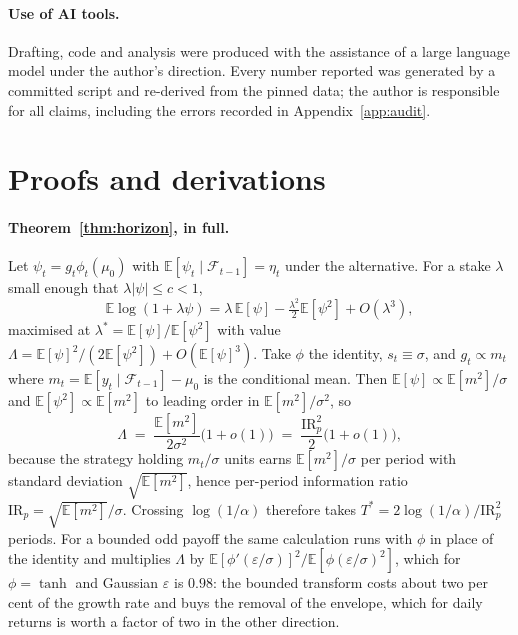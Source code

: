\documentclass{article}
\theoremstyle{plain}
\theoremstyle{definition}
\begin{document}
\paragraph{Use of AI tools.} Drafting, code and analysis were produced with the assistance of
a large language model under the author's direction. Every number reported was generated by a
committed script and re-derived from the pinned data; the author is responsible for all
claims, including the errors recorded in Appendix~\ref{app:audit}.




\appendix

\section{Proofs and derivations}
\label{app:proofs}

\paragraph{Theorem~\ref{thm:horizon}, in full.} Let $\psi_t=g_t\phi_t(\mu_0)$ with
$\mathbb{E}[\psi_t\mid\mathcal{F}_{t-1}]=\eta_t$ under the alternative. For a stake
$\lambda$ small enough that $\lambda|\psi|\le c<1$,
\[
  \mathbb{E}\log(1+\lambda\psi)
  = \lambda\,\mathbb{E}[\psi] - \tfrac{\lambda^2}{2}\mathbb{E}[\psi^2] + O(\lambda^3),
\]
maximised at $\lambda^\ast=\mathbb{E}[\psi]/\mathbb{E}[\psi^2]$ with value
$\Lambda=\mathbb{E}[\psi]^2/(2\mathbb{E}[\psi^2])+O(\mathbb{E}[\psi]^3)$. Take $\phi$ the
identity, $s_t\equiv\sigma$, and $g_t\propto m_t$ where $m_t=\mathbb{E}[y_t\mid
\mathcal{F}_{t-1}]-\mu_0$ is the conditional mean. Then $\mathbb{E}[\psi]\propto
\mathbb{E}[m^2]/\sigma$ and $\mathbb{E}[\psi^2]\propto\mathbb{E}[m^2]$ to leading order in
$\mathbb{E}[m^2]/\sigma^2$, so
\[
  \Lambda \;=\; \frac{\mathbb{E}[m^2]}{2\sigma^2}\big(1+o(1)\big)
           \;=\; \frac{\mathrm{IR}_p^{2}}{2}\big(1+o(1)\big),
\]
because the strategy holding $m_t/\sigma$ units earns $\mathbb{E}[m^2]/\sigma$ per period
with standard deviation $\sqrt{\mathbb{E}[m^2]}$, hence per-period information ratio
$\mathrm{IR}_p=\sqrt{\mathbb{E}[m^2]}/\sigma$. Crossing $\log(1/\alpha)$ therefore takes
$T^\ast=2\log(1/\alpha)/\mathrm{IR}_p^2$ periods. For a bounded odd payoff the same
calculation runs with $\phi$ in place of the identity and multiplies $\Lambda$ by
$\mathbb{E}[\phi'(\varepsilon/\sigma)]^2/\mathbb{E}[\phi(\varepsilon/\sigma)^2]$, which for
$\phi=\tanh$ and Gaussian $\varepsilon$ is $0.98$: the bounded transform costs about two per
cent of the growth rate and buys the removal of the envelope, which for daily returns is
worth a factor of two in the other direction.
\end{document}
